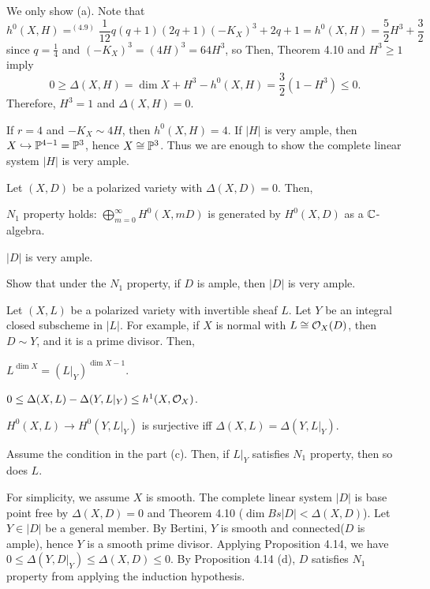\documentclass{../../small}
\begin{document}
\begin{pf}
We only show (a).
Note that
\[h^0(X,H)=^{(4.9)}\frac1{12}q(q+1)(2q+1)(-K_X)^3+2q+1=h^0(X,H)=\frac52H^3+\frac32\]
since $q=\frac14$ and $(-K_X)^3=(4H)^3=64H^3$, so
Then, Theorem 4.10 and $H^3\ge1$ imply
\[0\ge\Delta(X,H)=\dim X+H^3-h^0(X,H)=\frac32(1-H^3)\le0.\]
Therefore, $H^3=1$ and $\Delta(X,H)=0$.
\end{pf}

\begin{rmk}
If $r=4$ and $-K_X\sim4H$, then $h^0(X,H)=4$.
If $|H|$ is very ample, then $X\hookrightarrow\P^{4-1}=\P^3$, hence $X\cong\P^3$.
Thus we are enough to show the complete linear system $|H|$ is very ample.
\end{rmk}

\begin{thm}
Let $(X,D)$ be a polarized variety with $\Delta(X,D)=0$.
Then,
\begin{parts}
\item $N_1$ property holds: $\bigoplus_{m=0}^\infty H^0(X,mD)$ is generated by $H^0(X,D)$ as a $\C$-algebra.
\item $|D|$ is very ample.
\end{parts}
\end{thm}

\begin{exe}
Show that under the $N_1$ property, if $D$ is ample, then $|D|$ is very ample.
\end{exe}

\begin{prop}
Let $(X,L)$ be a polarized variety with invertible sheaf $L$.
Let $Y$ be an integral closed subscheme in $|L|$.
For example, if $X$ is normal with $L\cong\cO_X(D)$, then $D\sim Y$, and it is a prime divisor.
Then,
\begin{parts}
\item $L^{\dim X}=(L|_Y)^{\dim X-1}$.
\item $0\le\Delta(X,L)-\Delta(Y,L|_Y)\le h^1(X,\cO_X)$.
\item $H^0(X,L)\to H^0(Y,L|_Y)$ is surjective iff $\Delta(X,L)=\Delta(Y,L|_Y)$.
\item Assume the condition in the part (c). Then, if $L|_Y$ satisfies $N_1$ property, then so does $L$.
\end{parts}
\end{prop}

\begin{pf}
For simplicity, we assume $X$ is smooth.
The complete linear system $|D|$ is base point free by $\Delta(X,D)=0$ and Theorem 4.10 ($\dim Bs|D|<\Delta(X,D)$).
Let $Y\in|D|$ be a general member.
By Bertini, $Y$ is smooth and connected($D$ is ample), hence $Y$ is a smooth prime divisor.
Applying Proposition 4.14, we have $0\le\Delta(Y,D|_Y)\le\Delta(X,D)\le0$.
By Proposition 4.14 (d), $D$ satisfies $N_1$ property from applying the induction hypothesis.
\end{pf}
\end{document}
